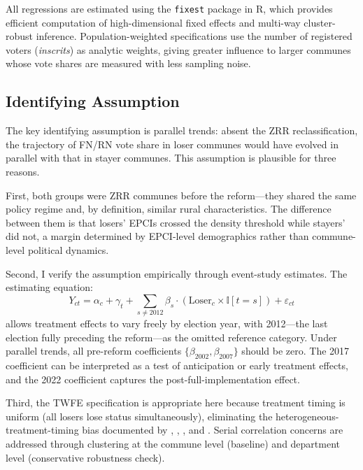 \documentclass[12pt]{article}
\newcommand{\ind}{\mathbb{I}}
\begin{document}
All regressions are estimated using the \texttt{fixest} package in R, which provides efficient computation of high-dimensional fixed effects and multi-way cluster-robust inference. Population-weighted specifications use the number of registered voters (\textit{inscrits}) as analytic weights, giving greater influence to larger communes whose vote shares are measured with less sampling noise.

\subsection{Identifying Assumption}

The key identifying assumption is parallel trends: absent the ZRR reclassification, the trajectory of FN/RN vote share in loser communes would have evolved in parallel with that in stayer communes. This assumption is plausible for three reasons.

First, both groups were ZRR communes before the reform---they shared the same policy regime and, by definition, similar rural characteristics. The difference between them is that losers' EPCIs crossed the density threshold while stayers' did not, a margin determined by EPCI-level demographics rather than commune-level political dynamics.

Second, I verify the assumption empirically through event-study estimates. The estimating equation:
\begin{equation} \label{eq:es}
Y_{ct} = \alpha_c + \gamma_t + \sum_{s \neq 2012} \beta_s \cdot (\text{Loser}_c \times \ind[t = s]) + \varepsilon_{ct}
\end{equation}
allows treatment effects to vary freely by election year, with 2012---the last election fully preceding the reform---as the omitted reference category. Under parallel trends, all pre-reform coefficients $\{\beta_{2002}, \beta_{2007}\}$ should be zero. The 2017 coefficient can be interpreted as a test of anticipation or early treatment effects, and the 2022 coefficient captures the post-full-implementation effect.

Third, the TWFE specification is appropriate here because treatment timing is uniform (all losers lose status simultaneously), eliminating the heterogeneous-treatment-timing bias documented by \citet{goodman2021difference}, \citet{deChaisemartin2020two}, \citet{callaway2021difference}, and \citet{sun2021estimating}. Serial correlation concerns \citep{bertrand2004much} are addressed through clustering at the commune level (baseline) and department level (conservative robustness check).
\end{document}

